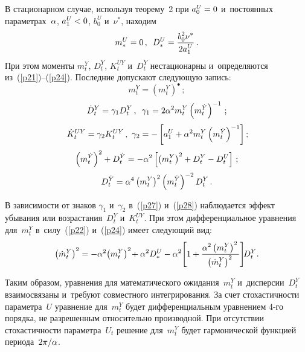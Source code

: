 \begin{multicols}{2}
{В стационарном случае, используя теорему~2 при $a_0^U\hm=0$ и~постоянных 
параметрах~$\alpha$, $a_1^U\hm<0$, $ b_0^U$ и~$\nu^*$, находим
    \begin{equation*}
    m_*^U =0 \,,\enskip 
    D_*^U = \displaystyle\frac{\displaystyle b_0^2 \nu^*\mathstrut}{\displaystyle 2 a_1^U\mathstrut}\,. 
    \end{equation*}
При этом моменты $m_t^Y$, $D_t^Y$, $K_t^{UY}$ и~$D_t^{\dot Y}$ 
нестационарны и~определяются из~(\ref{p21})--(\ref{p24}). 
Последние допускают следующую запись:
     \begin{equation*}
     m_t^{\dot Y} = \left(m_t^Y\right)^\bullet\,;
     \end{equation*}
    \begin{equation}
    \dot D_t^{Y} =\gamma_1 D_t^Y\,,\enskip 
     \gamma_1 = 2 \alpha^2 m_t^Y \left(m_t^{\dot Y}\right)^{-1}\,;
     \label{p27}
     \end{equation}
    \begin{equation}
    \dot K_t^{UY} =\gamma_2 K_t^{UY}\,,\  
     \gamma_2 =-\left[ a_1^U+\alpha^2 m_t^Y \left(m_t^{\dot Y}\right)^{-1}\right];\!
     \label{p28}
     \end{equation}
    \begin{equation*}
    \left(m_t^{\dot Y}\right)^{2}+D_t^{\dot Y} =
     -\alpha^2 \left[ \left(m_t^{Y}\right)^{2}+D_t^Y - D_t^U\right]\,;
     \end{equation*}
    \begin{equation*}
    D_t^{\dot Y}=  \alpha^4  \left( m_t^{Y} \right)^{2}\left( m_t^{\dot Y}\right)^{-2}
     D_t^Y\,.
     \end{equation*}

В зависимости от знаков  $\gamma_1$ и~$\gamma_2$ в~(\ref{p27}) и~(\ref{p28}) 
наблюдается эффект убывания или возрастания~$D_t^Y$ и~$K_t^{UY}$. При этом 
дифференциальное уравнения для~$m_t^Y$ в~силу~(\ref{p22}) и~(\ref{p24}) 
имеет следующий вид:
    \begin{equation*}
    \left(\dot m_t^{Y}\right)^2 =-\alpha^2 \!\left(m_t^{Y}\right)^{2}\! + 
    \alpha^2 D_*^U - \alpha^2\! \left[ 1+ 
    \displaystyle\frac{\displaystyle \alpha^2 \left(m_t^{Y}\right)^{2}\mathstrut}{\displaystyle \left(\dot m_t^{Y}\right)^{2}\mathstrut}\right]\!\! D_t^Y.
    \end{equation*}

Таким образом, уравнения для математического ожидания~$m_t^Y$ и~дисперсии~$D_t^Y$ 
взаимосвязаны и~требуют совместного интегрирования. За счет стохастичности 
параметра~$U$ уравнение для~$m_t^Y$ будет дифференциальным уравнением 4-го порядка, 
не разрешенным относительно производной. При отсутствии стохастичности па\-ра\-мет\-ра~$U_t$ 
решение для~$m_t^Y$ будет гармонической функцией периода~$2\pi/\alpha$.

}
\end{multicols}
